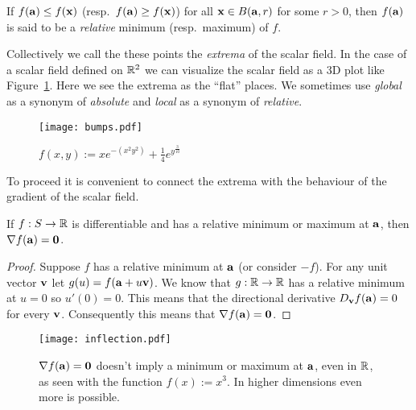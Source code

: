 \begin{definition}
    If \(f(\aa)\leq f(\xx)\) (resp.\ \(f(\aa)\geq f(\xx)\)) for all \(\xx \in B(\aa,r)\) for some \(r>0\), then \(f(\aa)\) is said to be a \emph{relative} minimum (resp.\ maximum) of \(f\).
\end{definition}

Collectively we call the these points the \emph{extrema} of the scalar field.
In the case of a scalar field defined on \(\bR^2\) we can visualize the scalar field as a 3D plot like Figure~\ref{fig:bumps}.
Here we see the extrema as the ``flat'' places.
We sometimes use \emph{global} as a synonym of \emph{absolute} and \emph{local} as a synonym of \emph{relative}.


\begin{figure}[htbp]
    \begin{center}
        \texttt{[image: bumps.pdf]}
        \caption{\(f(x,y) := x e^{-(x^2y^2)}  + \frac{1}{4}e^{y^\frac{3}{10}}\)}%
        \label{fig:bumps}
    \end{center}
\end{figure}

To proceed it is convenient to connect the extrema with the behaviour of the gradient of the scalar field.

\begin{theorem}%
    \label{thm:is-stationary}
    If \(f:S\to\bR\) is differentiable and has a relative minimum or maximum at \(\aa\), then \(\nabla f(\aa)=  \mathbf{0}\).
\end{theorem}

\begin{proof}
    Suppose \(f\) has a relative minimum at \(\aa\) (or consider \(-f\)).
    For any unit vector \(\vv\) let \(g(u) = f(\aa+u\vv)\).
    We know that \(g:\bR \to \bR\) has a relative minimum at \(u=0\) so \(u'(0)=0\).
    This means that the directional derivative \(D_{\vv} f(\aa) = 0\) for every \(\vv\).
    Consequently this means that \(\nabla f (\aa)= \mathbf{0}\).
\end{proof}

\begin{figure}[htbp]
    \begin{center}
        \texttt{[image: inflection.pdf]}
        \caption{\(\nabla f(\aa) =  \mathbf{0}\) doesn't imply a minimum or maximum at \(\aa\), even in \(\bR\), as seen with the function \(f(x):=x^3\). In higher dimensions even more is possible.}%
        \label{fig:inflection}
    \end{center}
\end{figure}

